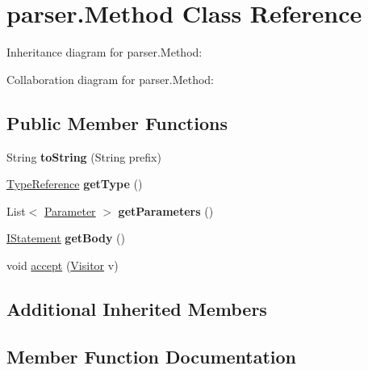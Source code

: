 \hypertarget{classparser_1_1_method}{}\section{parser.\+Method Class Reference}
\label{classparser_1_1_method}


Inheritance diagram for parser.\+Method\+:


Collaboration diagram for parser.\+Method\+:
\subsection*{Public Member Functions}
\begin{DoxyCompactItemize}
\item 
String {\bfseries to\+String} (String prefix)\hypertarget{classparser_1_1_method_adb442e60c9e5d89e4723b093b54e2976}{}\label{classparser_1_1_method_adb442e60c9e5d89e4723b093b54e2976}

\item 
\hyperlink{classparser_1_1_type_reference}{Type\+Reference} {\bfseries get\+Type} ()\hypertarget{classparser_1_1_method_af4ca354cd407f9f7947de099ad18adcc}{}\label{classparser_1_1_method_af4ca354cd407f9f7947de099ad18adcc}

\item 
List$<$ \hyperlink{classparser_1_1_parameter}{Parameter} $>$ {\bfseries get\+Parameters} ()\hypertarget{classparser_1_1_method_ac5753e274f02f5bd0ffd297745b64841}{}\label{classparser_1_1_method_ac5753e274f02f5bd0ffd297745b64841}

\item 
\hyperlink{interfaceparser_1_1_i_statement}{I\+Statement} {\bfseries get\+Body} ()\hypertarget{classparser_1_1_method_aa1bc56b0ed24d1cb55866b01a7659d24}{}\label{classparser_1_1_method_aa1bc56b0ed24d1cb55866b01a7659d24}

\item 
void \hyperlink{classparser_1_1_method_a8e67b728b0a1423c37b47450b10b62fe}{accept} (\hyperlink{interfacemain_1_1_visitor}{Visitor} v)
\end{DoxyCompactItemize}
\subsection*{Additional Inherited Members}


\subsection{Member Function Documentation}
